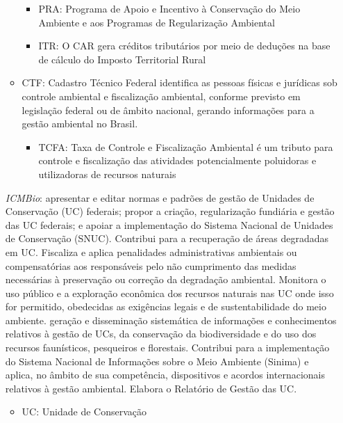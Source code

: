 \documentclass[
]{article}
\providecommand{\tightlist}{%
  \setlength{\itemsep}{0pt}\setlength{\parskip}{0pt}}
\begin{document}
\begin{itemize}
\begin{itemize}
    \begin{itemize}
    \tightlist
    \item
      PRA: Programa de Apoio e Incentivo à Conservação do Meio Ambiente
      e aos Programas de Regularização Ambiental
    \item
      ITR: O CAR gera créditos tributários por meio de deduções na base
      de cálculo do Imposto Territorial Rural
    \end{itemize}
  \item
    CTF: Cadastro Técnico Federal identifica as pessoas físicas e
    jurídicas sob controle ambiental e fiscalização ambiental, conforme
    previsto em legislação federal ou de âmbito nacional, gerando
    informações para a gestão ambiental no Brasil.

    \begin{itemize}
    \tightlist
    \item
      TCFA: Taxa de Controle e Fiscalização Ambiental é um tributo para
      controle e fiscalização das atividades potencialmente poluidoras e
      utilizadoras de recursos naturais
    \end{itemize}
  \end{itemize}

  \emph{ICMBio}: apresentar e editar normas e padrões de gestão de
  Unidades de Conservação (UC) federais; propor a criação, regularização
  fundiária e gestão das UC federais; e apoiar a implementação do
  Sistema Nacional de Unidades de Conservação (SNUC). Contribui para a
  recuperação de áreas degradadas em UC. Fiscaliza e aplica penalidades
  administrativas ambientais ou compensatórias aos responsáveis pelo não
  cumprimento das medidas necessárias à preservação ou correção da
  degradação ambiental. Monitora o uso público e a exploração econômica
  dos recursos naturais nas UC onde isso for permitido, obedecidas as
  exigências legais e de sustentabilidade do meio ambiente. geração e
  disseminação sistemática de informações e conhecimentos relativos à
  gestão de UCs, da conservação da biodiversidade e do uso dos recursos
  faunísticos, pesqueiros e florestais. Contribui para a implementação
  do Sistema Nacional de Informações sobre o Meio Ambiente (Sinima) e
  aplica, no âmbito de sua competência, dispositivos e acordos
  internacionais relativos à gestão ambiental. Elabora o Relatório de
  Gestão das UC.

  \begin{itemize}
  \item
    UC: Unidade de Conservação


\end{itemize}
\end{itemize}
\end{document}
